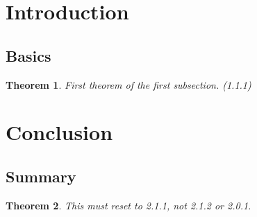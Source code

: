 \documentclass{article}
\newtheorem{theorem}{Theorem}[section]
\numberwithin{theorem}{subsection}
\begin{document}
\section{Introduction}
\subsection{Basics}

\begin{theorem}
First theorem of the first subsection. (1.1.1)
\end{theorem}

\section{Conclusion}
\subsection{Summary}

\begin{theorem}
This must reset to 2.1.1, not 2.1.2 or 2.0.1.
\end{theorem}
\end{document}
